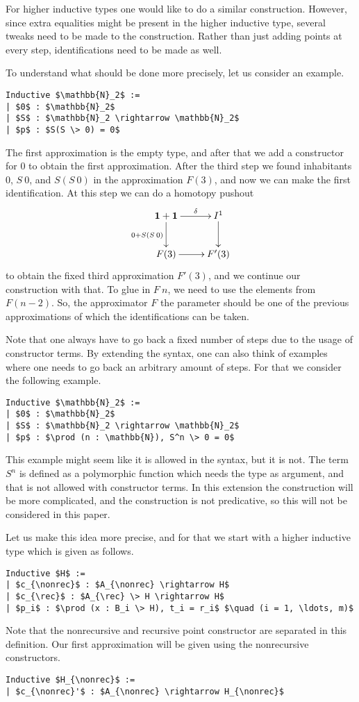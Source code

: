 \documentclass[a4paper,UKenglish]{lipics-v2016}
\newcommand{\one}[0]{\textbf{1}}
\newcommand{\rec}[0]{\operatorname{rec}}
\newcommand{\nonrec}[0]{\operatorname{nonrec}}
\begin{document}
For higher inductive types one would like to do a similar construction.
However, since extra equalities might be present in the higher inductive type, several tweaks need to be made to the construction.
Rather than just adding points at every step, identifications need to be made as well.

To understand what should be done more precisely, let us consider an example.
\lstset{language=Coq}
\begin{lstlisting}
Inductive $\mathbb{N}_2$ :=
| $0$ : $\mathbb{N}_2$
| $S$ : $\mathbb{N}_2 \rightarrow \mathbb{N}_2$
| $p$ : $S(S \> 0) = 0$
\end{lstlisting}
The first approximation is the empty type, and after that we add a constructor for 0 to obtain the first approximation.
After the third step we found inhabitants $0$, $S \> 0$, and $S(S \> 0)$ in the approximation $F(3)$, and now we can make the first identification.
At this step we can do a homotopy pushout
\[
\xymatrix
{
	\one + \one \ar[d]_{0 + S(S \> 0)} \ar[r]^-{\delta} & I^1 \ar[d]\\
	F(3) \ar[r] & F'(3)
}
\]
to obtain the fixed third approximation $F'(3)$, and we continue our construction with that.
To glue in $F \> n$, we need to use the elements from $F(n-2)$.
So, the approximator $F$ the parameter should be one of the previous approximations of which the identifications can be taken.

Note that one always have to go back a fixed number of steps due to the usage of constructor terms.
By extending the syntax, one can also think of examples where one needs to go back an arbitrary amount of steps.
For that we consider the following example.
\lstset{language=Coq}
\begin{lstlisting}
Inductive $\mathbb{N}_2$ :=
| $0$ : $\mathbb{N}_2$
| $S$ : $\mathbb{N}_2 \rightarrow \mathbb{N}_2$
| $p$ : $\prod (n : \mathbb{N}), S^n \> 0 = 0$
\end{lstlisting}
This example might seem like it is allowed in the syntax, but it is not.
The term $S^n$ is defined as a polymorphic function which needs the type as argument, and that is not allowed with constructor terms.
In this extension the construction will be more complicated, and the construction is not predicative, so this will not be considered in this paper.

Let us make this idea more precise, and for that we start with a higher inductive type which is given as follows.
\lstset{language=Coq}
\begin{lstlisting}[label={lst:HIT}]
Inductive $H$ :=
| $c_{\nonrec}$ : $A_{\nonrec} \rightarrow H$
| $c_{\rec}$ : $A_{\rec} \> H \rightarrow H$
| $p_i$ : $\prod (x : B_i \> H), t_i = r_i$ $\quad (i = 1, \ldots, m)$
\end{lstlisting}
Note that the nonrecursive and recursive point constructor are separated in this definition.
Our first approximation will be given using the nonrecursive constructors.
\lstset{language=Coq}
\begin{lstlisting}
Inductive $H_{\nonrec}$ :=
| $c_{\nonrec}'$ : $A_{\nonrec} \rightarrow H_{\nonrec}$
\end{lstlisting}
\end{document}
